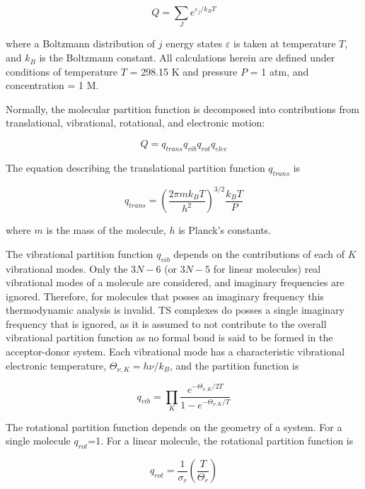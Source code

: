 \begin{doublespace}
\begin{equation}
  Q = \sum_J e^{\varepsilon_j/k_B T}
\end{equation}

\noindent where a Boltzmann distribution of $j$ energy states $\varepsilon$ is
taken at temperature $T$, and $k_B$ is the Boltzmann constant. All calculations
herein are defined under conditions of temperature $T$ = 298.15 K and pressure
$P$ = 1 atm, and concentration = 1 M.

Normally, the molecular partition function is decomposed into contributions
from translational, vibrational, rotational, and electronic motion:

\begin{equation}
  Q = q_{trans}q_{vib}q_{rot}q_{elec}
\end{equation}

\noindent The equation describing the translational partition function
$q_{trans}$ is

\begin{equation}
  q_{trans} = \left( \frac{2\pi m k_B T}{h^2} \right)^{3/2} \frac{k_B T}{P}
\end{equation}

\noindent where $m$ is the mass of the molecule, $h$ is Planck's constants.

The vibrational partition function $q_{vib}$ depends on the contributions of
each of $K$ vibrational modes. Only the $3N-6$ (or $3N-5$ for linear molecules)
real vibrational modes of a molecule are considered, and imaginary frequencies
are ignored. Therefore, for molecules that posses an imaginary frequency this
thermodynamic analysis is invalid. TS complexes do posses a single imaginary
frequency that is ignored, as it is assumed to not contribute to the overall
vibrational partition function as no formal bond is said to be formed in the
acceptor-donor system. Each vibrational mode has a characteristic vibrational
electronic temperature, $\Theta_{\nu,K} = h\nu/k_B$, and the partition function
is

\begin{equation}
  q_{vib} = \prod_K \frac{e^{-\Theta_{\nu,K}/2T}}{1 - e^{-\Theta_{\nu,K}/T}}
\end{equation}

The rotational partition function depends on the geometry of a system. For a
single molecule $q_{rot}$=1. For a linear molecule, the rotational partition
function is

\begin{equation}
  q_{rot} = \frac{1}{\sigma_r} \left(\frac{T}{\Theta_r}\right)
\end{equation}


\end{doublespace}
